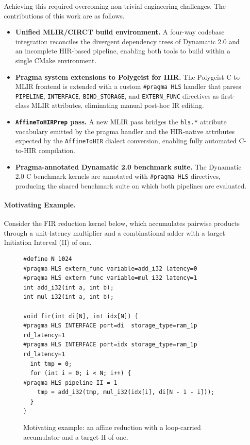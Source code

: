 \documentclass[sigplan,10pt,review,nonacm]{acmart}
\begin{document}
Achieving this required overcoming non-trivial engineering challenges.
The contributions of this work are as follows.

\begin{itemize}
  \item \textbf{Unified MLIR/CIRCT build environment.} A four-way
        codebase integration reconciles the divergent dependency trees
        of Dynamatic 2.0 and an incomplete HIR-based pipeline,
        enabling both tools to build within a single CMake environment.

  \item \textbf{Pragma system extensions to Polygeist for HIR.}
        The Polygeist C-to-MLIR frontend is extended with a custom
        \texttt{\#pragma HLS} handler that parses \texttt{PIPELINE},
        \texttt{INTERFACE}, \texttt{BIND\_STORAGE}, and
        \texttt{EXTERN\_FUNC} directives as first-class MLIR
        attributes, eliminating manual post-hoc IR editing.

  \item \textbf{\texttt{AffineToHIRPrep} pass.} A new MLIR pass
        bridges the \texttt{hls.*} attribute vocabulary emitted by the
        pragma handler and the HIR-native attributes expected by the
        \texttt{AffineToHIR} dialect conversion, enabling fully
        automated C-to-HIR compilation.

  \item \textbf{Pragma-annotated Dynamatic 2.0 benchmark suite.} The
        Dynamatic 2.0 C benchmark kernels are annotated with
        \texttt{\#pragma HLS} directives, producing the shared
        benchmark suite on which both pipelines are evaluated.
\end{itemize}

\paragraph{Motivating Example.}
Consider the FIR reduction kernel below, which accumulates pairwise
products through a unit-latency multiplier and a combinational adder
with a target Initiation Interval (II) of one.

\begin{figure}[h]
\begin{lstlisting}
#define N 1024
#pragma HLS extern_func variable=add_i32 latency=0
#pragma HLS extern_func variable=mul_i32 latency=1
int add_i32(int a, int b);
int mul_i32(int a, int b);

void fir(int di[N], int idx[N]) {
#pragma HLS INTERFACE port=di  storage_type=ram_1p rd_latency=1
#pragma HLS INTERFACE port=idx storage_type=ram_1p rd_latency=1
  int tmp = 0;
  for (int i = 0; i < N; i++) {
#pragma HLS pipeline II = 1
    tmp = add_i32(tmp, mul_i32(idx[i], di[N - 1 - i]));
  }
}
\end{lstlisting}
\caption{Motivating example: an affine reduction with a loop-carried
         accumulator and a target II of one.}
\label{lst:motiv}
\end{figure}
\end{document}
